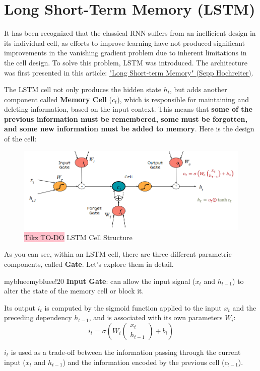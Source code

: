 \section{Long Short-Term Memory (LSTM)}

It has been recognized that the classical RNN suffers from an inefficient design in its individual cell, as efforts to improve learning have not produced significant improvements in the vanishing gradient problem due to inherent limitations in the cell design. To solve this problem, LSTM was introduced. The architecture was first presented in this article: \href{https://deeplearning.cs.cmu.edu/F23/document/readings/LSTM.pdf}{"Long Short-term Memory" (Sepp Hochreiter)}.

The LSTM cell not only produces the hidden state $h_t$, but adds another component called \textbf{Memory Cell} ($c_t$), which is responsible for maintaining and deleting information, based on the input context. This means that \textbf{some of the previous information must be remembered, some must be forgotten, and some new information must be added to memory}. Here is the design of the cell:

\begin{figure}[!htbp]
    \centering
    \includegraphics[width=\linewidth]{tikz/chapter6 - LSTM.png}
    \caption{{\color{red}\colorbox{pink}{Tikz TO-DO}} LSTM Cell Structure}
\end{figure}

As you can see, within an LSTM cell, there are three different parametric components, called \textbf{Gate}. Let's explore them in detail.

\begin{remark}{mybluee}{mybluee!20}
\textbf{Input Gate}: can allow the input signal ($x_t$ and $h_{t-1}$) to alter the state of the memory cell or block it.

Its output $i_t$ is computed by the sigmoid function applied to the input $x_t$ and the preceding dependency $h_{t-1}$, and is associated with its own parameters $W_i$:
$$ i_t = \sigma(W_i
\begin{pmatrix}
x_t \\
h_{t-1}
\end{pmatrix} + b_i)
$$

$i_t$ is used as a trade-off between the information passing through the current input ($x_t$ and $h_{t-1}$) and the information encoded by the previous cell ($c_{t-1}$).
\end{remark}


